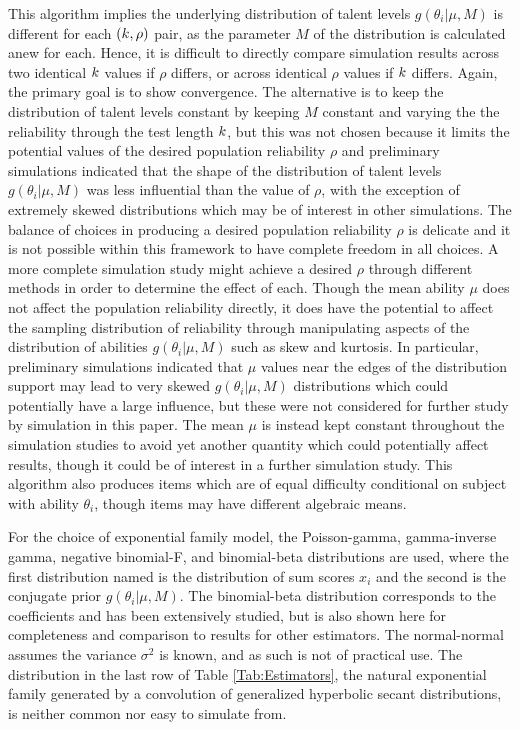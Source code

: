 \documentclass[12pt,epsfig]{article}
\newcommand{\changed}[1]{\textcolor{black}{#1}}
\newcommand{\testlength}{\changed{k}}%
\begin{document}
This algorithm implies the underlying distribution of talent levels $g(\theta_i | \mu, M)$ is different for each $(\testlength, \rho)$ pair, as the parameter $M$ of the distribution is calculated anew for each. Hence, it is difficult to directly compare simulation results across two identical $\testlength$ values if $\rho$ differs, or across identical $\rho$ values if $\testlength$ differs. Again, the primary goal is to show convergence. The alternative is to keep the distribution of talent levels constant by keeping $M$ constant and varying the the reliability through the test length $\testlength$, but this was not chosen because it limits the potential values of the desired population reliability $\rho$ and preliminary simulations indicated that the shape of the distribution of talent levels $g(\theta_i | \mu, M)$ was less influential than the value of $\rho$, with the exception of extremely skewed distributions which may be of interest in other simulations.  The balance of choices in producing a desired population reliability $\rho$ is delicate and it is not possible within this framework to have complete freedom in all choices.  A more complete simulation study might achieve a desired $\rho$ through different methods in order to determine the effect of each. Though the mean ability $\mu$ does not affect the population reliability directly, it does have the potential to affect the sampling distribution of reliability through manipulating aspects of the distribution of abilities $g(\theta_i | \mu, M)$ such as skew and kurtosis. In particular, preliminary simulations indicated that $\mu$ values near the edges of the distribution support may lead to very skewed $g(\theta_i | \mu, M)$ distributions which could potentially have a large influence, but these were not considered for further study by simulation in this paper. The mean $\mu$ is instead kept constant throughout the simulation studies to avoid yet another quantity which could potentially affect results, though it could be of interest in a further simulation study. This algorithm also produces items which are of equal difficulty conditional on subject with ability $\theta_i$, though items may have different algebraic means. %

For the choice of exponential family model, the Poisson-gamma, gamma-inverse gamma, negative binomial-F, and binomial-beta distributions are used, where the first distribution named is the distribution of sum scores $x_i$ and the second is the conjugate prior $g(\theta_i | \mu, M)$. The binomial-beta distribution corresponds to the \cite{Kuder1937} coefficients and has been extensively studied, but is also shown here for completeness and comparison to results for other estimators. The normal-normal assumes the variance $\sigma^2$ is known, and as such is not of practical use. The distribution in the last row of Table \ref{Tab:Estimators}, the natural exponential family generated by a convolution of generalized hyperbolic secant distributions, is neither common nor easy to simulate from.
\end{document}
